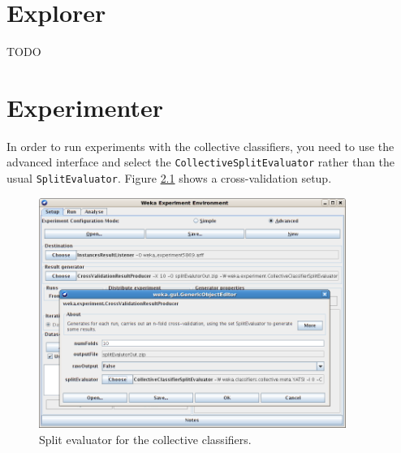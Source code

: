 \documentclass[a4paper]{book}
\begin{document}
\chapter{Explorer}
TODO

\chapter{Experimenter}
In order to run experiments with the collective classifiers, you need to use 
the advanced interface and select the \texttt{CollectiveSplitEvaluator} rather
than the usual \texttt{SplitEvaluator}. Figure \ref{splitevaluator} shows a
cross-validation setup.

\begin{figure}[htb]
  \centering
  \includegraphics[width=10.0cm]{images/splitevaluator.png}
  \caption{Split evaluator for the collective classifiers.}
  \label{splitevaluator}
\end{figure}



\end{document}
